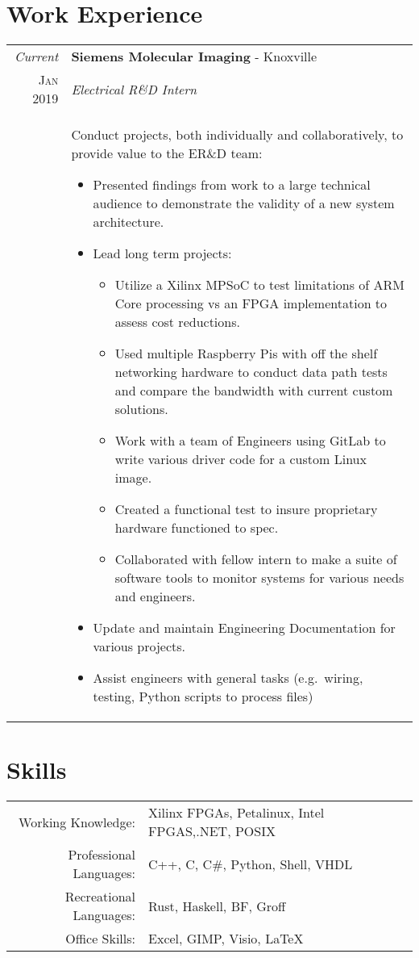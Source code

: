 \documentclass[a4paper,11pt]{article}
\begin{document}
\section{Work Experience}
\begin{tabularx}{\textwidth}{r|X}
   \emph{Current} & \textbf{Siemens Molecular Imaging} \-- Knoxville\\
   \textsc{Jan 2019} & \emph{Electrical R\&D Intern}\\
   & \small{Conduct projects, both individually and collaboratively, to provide value to the ER\&D team:
      \begin{itemize}[leftmargin=20pt,topsep=1pt,itemsep=1pt,partopsep=0pt, parsep=1pt]
         \item Presented findings from work to a large technical audience to demonstrate the validity of a new system architecture.
         \item Lead long term projects:
            \begin{itemize}[leftmargin=20pt,topsep=1pt,itemsep=1pt,partopsep=0pt, parsep=1pt]
               \item Utilize a Xilinx MPSoC to test limitations of ARM Core processing vs an FPGA implementation to assess cost reductions.
               \item Used multiple Raspberry Pis with off the shelf networking hardware to conduct data path tests and compare the bandwidth with current custom solutions.
               \item Work with a team of Engineers using GitLab to write various driver code for a custom Linux image.
               \item Created a functional test to insure proprietary hardware functioned to spec.
               \item Collaborated with fellow intern to make a suite of software tools to monitor systems for various needs and engineers.
            \end{itemize}
         \item Update and maintain Engineering Documentation for various projects.
         \item Assist engineers with general tasks (e.g.\ wiring, testing, Python scripts to process files)
      \vspace{-0.5cm}
      \end{itemize}}\\
\end{tabularx}

\section{Skills}
\begin{tabularx}{\textwidth}{rl}
   Working Knowledge: & Xilinx FPGAs, Petalinux, Intel FPGAS,.NET, POSIX\\
   Professional Languages:& C++, C, C\#, Python, Shell, VHDL\\
   Recreational Languages:& Rust, Haskell, BF, Groff \\
   Office Skills: & Excel, GIMP, Visio, \LaTeX{}\\
\end{tabularx}
\end{document}
